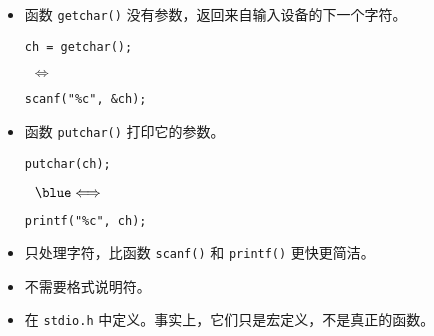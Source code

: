 \begin{frame}[fragile]
\begin{itemize}
\item 
函数 \lstinline|getchar()| 没有参数，返回来自输入设备的下一个字符。 \\[0.1in]

\begin{minipage}{0.3\textwidth}
\begin{lstlisting}[backgroundcolor=\color{red!20},]
ch = getchar();
\end{lstlisting} 
\end{minipage}
$~~ \Longleftrightarrow~~$
\begin{minipage}{0.4\textwidth}
\begin{lstlisting}[backgroundcolor=\color{red!20},]
scanf("%c", &ch);
\end{lstlisting} 
\end{minipage} \vspace{0.1in}

\item 
函数 \lstinline|putchar()| 打印它的参数。 \\[0.1in]

\begin{minipage}{0.35\textwidth}
\begin{lstlisting}[backgroundcolor=\color{red!20},]
putchar(ch);
\end{lstlisting} 
\end{minipage}
$~~\blue \Longleftrightarrow~~$
\begin{minipage}{0.4\textwidth}
\begin{lstlisting}[backgroundcolor=\color{red!20},]
printf("%c", ch);
\end{lstlisting} 
\end{minipage}
\end{itemize}
\end{frame}

\begin{frame}[fragile]
\begin{itemize}
\item 
只处理字符，比函数  \lstinline|scanf()| 和 \lstinline|printf()| 更快更简洁。\\[0.1in]
\item
不需要格式说明符。\\[0.1in]
\item
在 \lstinline|stdio.h| 中定义。事实上，它们只是宏定义，不是真正的函数。
\end{itemize}
\end{frame}

